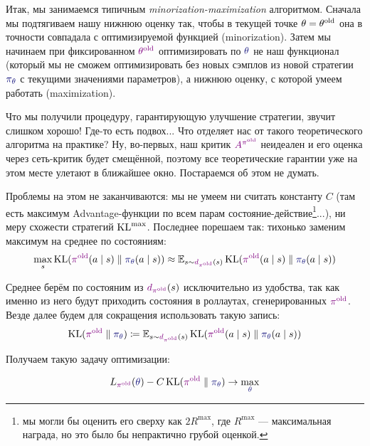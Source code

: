 Итак, мы занимаемся типичным \emph{minorization-maximization} алгоритмом. Сначала мы подтягиваем нашу нижнюю оценку так, чтобы в текущей точке $\theta \HM= \theta^{\old}$ она в точности совпадала с оптимизируемой функцией (minorization). Затем мы начинаем при фиксированном $\textcolor{ChadPurple}{\theta^{\old}}$ оптимизировать по $\textcolor{ChadBlue}{\theta}$ не наш функционал (который мы не сможем оптимизировать без новых сэмплов из новой стратегии $\textcolor{ChadBlue}{\pi_\theta}$ с текущими значениями параметров), а нижнюю оценку, с которой умеем работать (maximization). 

Что мы получили процедуру, гарантирующую улучшение стратегии, звучит слишком хорошо! Где-то есть подвох... Что отделяет нас от такого теоретического алгоритма на практике? Ну, во-первых, наш критик $\textcolor{ChadPurple}{A^{\pi^{\old}}}$ неидеален и его оценка через сеть-критик будет смещённой, поэтому все теоретические гарантии уже на этом месте улетают в ближайшее окно. Постараемся об этом не думать.

Проблемы на этом не заканчиваются: мы не умеем ни считать константу $C$ (там есть максимум Advantage-функции по всем парам состояние-действие\footnote{мы могли бы оценить его сверху как $2R^{\max}$, где $R^{\max}$ --- максимальная награда, но это было бы непрактично грубой оценкой.}...), ни меру схожести стратегий $\operatorname{KL}^{\max}$. Последнее порешаем так: тихонько заменим максимум на среднее по состояниям:
$$\max_s \KL(\textcolor{ChadPurple}{\pi^{\old}}(a \mid s) \parallel \textcolor{ChadBlue}{\pi_\theta}(a \mid s)) \approx \E_{s \sim \textcolor{ChadPurple}{d_{\pi^{\old}}}(s)} \KL(\textcolor{ChadPurple}{\pi^{\old}}(a \mid s) \parallel \textcolor{ChadBlue}{\pi_\theta}(a \mid s))$$

Среднее берём по состояним из $\textcolor{ChadPurple}{d_{\pi^{\old}}}(s)$ исключительно из удобства, так как именно из него будут приходить состояния в роллаутах, сгенерированных $\textcolor{ChadPurple}{\pi^{\old}}$. Везде далее будем для сокращения использовать такую запись:
$$\KL(\textcolor{ChadPurple}{\pi^{\old}} \parallel \textcolor{ChadBlue}{\pi_\theta}) \coloneqq \E_{s \sim \textcolor{ChadPurple}{d_{\pi^{\old}}}(s)} \KL(\textcolor{ChadPurple}{\pi^{\old}}(a \mid s) \parallel \textcolor{ChadBlue}{\pi_\theta}(a \mid s))$$ 

Получаем такую задачу оптимизации:

\begin{equation}\label{lowerboundmean}
L_{\textcolor{ChadPurple}{\pi^{\old}}}(\textcolor{ChadBlue}{\theta}) - C \KL(\textcolor{ChadPurple}{\pi^{\old}} \parallel \textcolor{ChadBlue}{\pi_\theta}) \to \max_{\textcolor{ChadBlue}{\theta}}
\end{equation}

